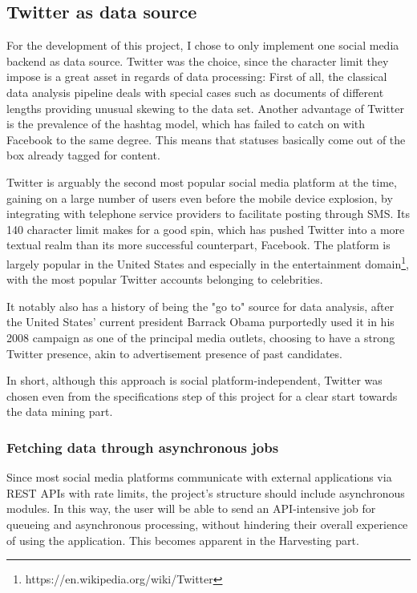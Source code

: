 \subsection{Twitter as data source}
For the development of this project, I chose to only implement one social media backend as data source. Twitter was the choice, since the character limit they impose is a great asset in regards of data processing: First of all, the classical data analysis pipeline deals with special cases such as documents of different lengths providing unusual skewing to the data set. Another advantage of Twitter is the prevalence of the hashtag model, which has failed to catch on with Facebook to the same degree. This means that statuses basically come out of the box already tagged for content.

Twitter is arguably the second most popular social media platform at the time, gaining on a large number of users even before the mobile device explosion, by integrating with telephone service providers to facilitate posting through SMS. Its 140 character limit makes for a good spin, which has pushed Twitter into a more textual realm than its more successful counterpart, Facebook. The platform is largely popular in the United States and especially in the entertainment domain\footnote{https://en.wikipedia.org/wiki/Twitter}, with the most popular Twitter accounts belonging to celebrities.

It notably also has a history of being the "go to" source for data analysis, after the United States' current president Barrack Obama purportedly used it in his 2008 campaign as one of the principal media outlets, choosing to have a strong Twitter presence, akin to advertisement presence of past candidates.

In short, although this approach is social platform-independent, Twitter was chosen even from the specifications step of this project for a clear start towards the data mining part.

\subsubsection{Fetching data through asynchronous jobs}
Since most social media platforms communicate with external applications via REST APIs with rate limits, the project's structure should include asynchronous modules. In this way, the user will be able to send an API-intensive job for queueing and asynchronous processing, without hindering their overall experience of using the application. This becomes apparent in the Harvesting part.

